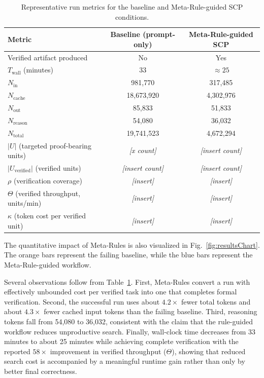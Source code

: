 \documentclass[conference]{IEEEtran}
\begin{document}
\begin{table}[!t]
\centering
\caption{Representative run metrics for the baseline and Meta-Rule-guided SCP conditions.}
\label{tab:results}
\small
\begin{tabular}{lcc}
\hline
Metric & Baseline (prompt-only) & Meta-Rule-guided SCP \\
\hline
Verified artifact produced & No & Yes \\
$T_{\mathrm{wall}}$ (minutes) & 33 & $\approx 25$ \\
$N_{\mathrm{in}}$ & 981,770 & 317,485 \\
$N_{\mathrm{cache}}$ & 18,673,920 & 4,302,976 \\
$N_{\mathrm{out}}$ & 85,833 & 51,833 \\
$N_{\mathrm{reason}}$ & 54,080 & 36,032 \\
$N_{\mathrm{total}}$ & 19,741,523 & 4,672,294 \\
$|U|$ (targeted proof-bearing units) & \textit{[x count]} & \textit{[insert count]} \\
$|U_{\mathrm{verified}}|$ (verified units) & \textit{[insert count]} & \textit{[insert count]} \\
$\rho$ (verification coverage) & \textit{[insert]} & \textit{[insert]} \\
$\Theta$ (verified throughput, units/min) & \textit{[insert]} & \textit{[insert]} \\
$\kappa$ (token cost per verified unit) & \textit{[insert]} & \textit{[insert]} \\
\hline
\end{tabular}
\end{table}

The quantitative impact of Meta-Rules is also visualized in Fig.~\ref{fig:resultsChart}. The orange bars represent the failing baseline, while the blue bars represent the Meta-Rule-guided workflow.

Several observations follow from Table~\ref{tab:results}. First, Meta-Rules convert a run with effectively unbounded cost per verified task into one that completes formal verification. Second, the successful run uses about $4.2\times$ fewer total tokens and about $4.3\times$ fewer cached input tokens than the failing baseline. Third, reasoning tokens fall from 54,080 to 36,032, consistent with the claim that the rule-guided workflow reduces unproductive search. Finally, wall-clock time decreases from 33 minutes to about 25 minutes while achieving complete verification with the reported $58\times$ improvement in verified throughput ($\Theta$), showing that reduced search cost is accompanied by a meaningful runtime gain rather than only by better final correctness.
\end{document}

